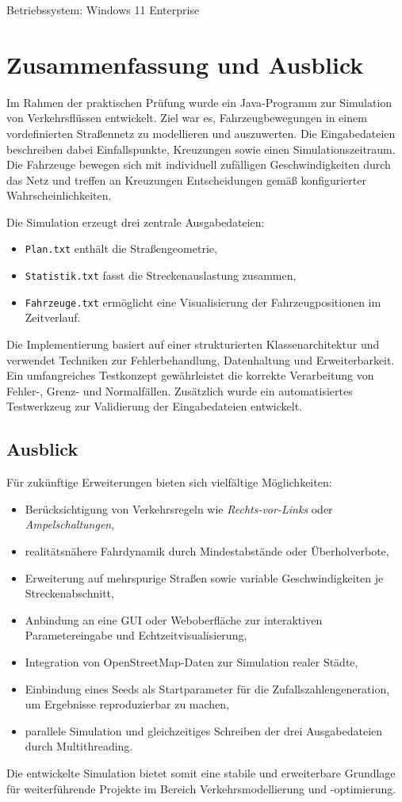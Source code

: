 \documentclass[a4paper,12pt]{report}
\begin{document}
Betriebssystem: Windows 11 Enterprise

\chapter{Zusammenfassung und Ausblick}

Im Rahmen der praktischen Prüfung wurde ein Java-Programm zur Simulation von Verkehrsflüssen entwickelt. Ziel war es, Fahrzeugbewegungen in einem vordefinierten Straßennetz zu modellieren und auszuwerten.
Die Eingabedateien beschreiben dabei Einfallspunkte, Kreuzungen sowie einen Simulationszeitraum. Die Fahrzeuge bewegen sich mit individuell zufälligen Geschwindigkeiten durch das Netz und treffen an Kreuzungen Entscheidungen gemäß konfigurierter Wahrscheinlichkeiten.

Die Simulation erzeugt drei zentrale Ausgabedateien:
\begin{itemize}
    \item \texttt{Plan.txt} enthält die Straßengeometrie,
    \item \texttt{Statistik.txt} fasst die Streckenauslastung zusammen,
    \item \texttt{Fahrzeuge.txt} ermöglicht eine Visualisierung der Fahrzeugpositionen im Zeitverlauf.
\end{itemize}

Die Implementierung basiert auf einer strukturierten Klassenarchitektur und verwendet Techniken zur Fehlerbehandlung, Datenhaltung und Erweiterbarkeit.
Ein umfangreiches Testkonzept gewährleistet die korrekte Verarbeitung von Fehler-, Grenz- und Normalfällen.
Zusätzlich wurde ein automatisiertes Testwerkzeug zur Validierung der Eingabedateien entwickelt.

\section*{Ausblick}

Für zukünftige Erweiterungen bieten sich vielfältige Möglichkeiten:
\begin{itemize}
    \item Berücksichtigung von Verkehrsregeln wie \emph{Rechts-vor-Links} oder \emph{Ampelschaltungen},
    \item realitätsnähere Fahrdynamik durch Mindestabstände oder Überholverbote,
    \item Erweiterung auf mehrspurige Straßen sowie variable Geschwindigkeiten je Streckenabschnitt,
    \item Anbindung an eine GUI oder Weboberfläche zur interaktiven Parametereingabe und Echtzeitvisualisierung,
    \item Integration von OpenStreetMap-Daten zur Simulation realer Städte,
    \item Einbindung eines Seeds als Startparameter für die Zufallszahlengeneration, um Ergebnisse reproduzierbar zu machen,
    \item parallele Simulation und gleichzeitiges Schreiben der drei Ausgabedateien durch Multithreading.
\end{itemize}

Die entwickelte Simulation bietet somit eine stabile und erweiterbare Grundlage für weiterführende Projekte im Bereich Verkehrsmodellierung und -optimierung.
\end{document}
